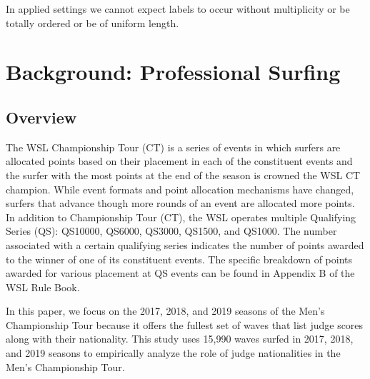\documentclass{article}
\begin{document}
In applied settings we cannot expect labels to occur without multiplicity or be totally ordered or be of uniform length.


\section{Background: Professional Surfing}

\subsection{Overview}
The WSL Championship Tour (CT) is a series of events in which surfers are allocated points based on their placement in each of the constituent events and the surfer with the most points at the end of the season is crowned the WSL CT champion. While event formats and point allocation mechanisms have changed, surfers that advance though more rounds of an event are allocated more points. In addition to Championship Tour (CT), the WSL operates multiple Qualifying Series (QS): QS10000, QS6000, QS3000, QS1500, and QS1000. The number associated with a certain qualifying series indicates the number of points awarded to the winner of one of its constituent events. The specific breakdown of points awarded for various placement at QS events can be found in Appendix B of the WSL Rule Book.

In this paper, we focus on the 2017, 2018, and 2019 seasons of the Men’s Championship Tour because it offers the fullest set of waves that list judge scores along with their nationality. This study uses 15,990 waves surfed in 2017, 2018, and 2019 seasons to empirically analyze the role of judge nationalities in the Men's Championship Tour.
\end{document}
